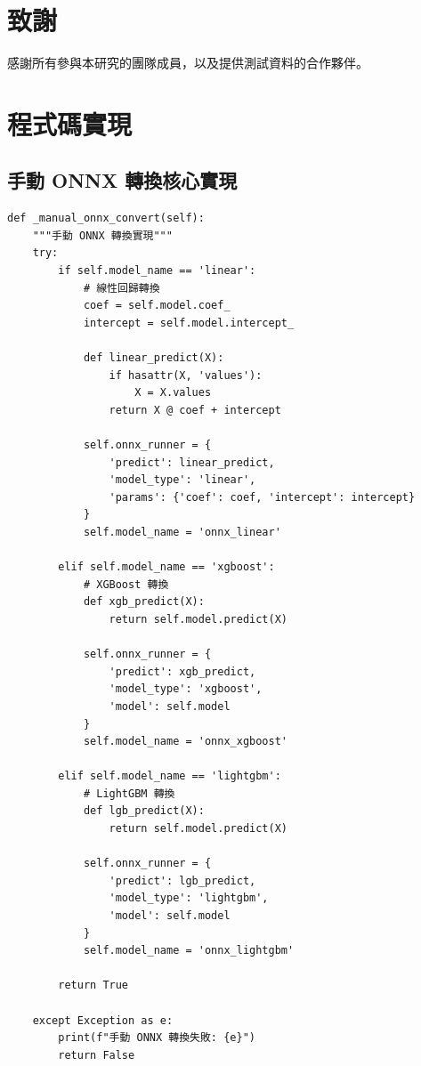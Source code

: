 \documentclass[11pt,a4paper]{article}
\begin{document}
\section*{致謝}

感謝所有參與本研究的團隊成員，以及提供測試資料的合作夥伴。




\appendix

\section{程式碼實現}

\subsection{手動 ONNX 轉換核心實現}

\begin{lstlisting}[caption=手動 ONNX 轉換實現]
def _manual_onnx_convert(self):
    """手動 ONNX 轉換實現"""
    try:
        if self.model_name == 'linear':
            # 線性回歸轉換
            coef = self.model.coef_
            intercept = self.model.intercept_
            
            def linear_predict(X):
                if hasattr(X, 'values'):
                    X = X.values
                return X @ coef + intercept
            
            self.onnx_runner = {
                'predict': linear_predict,
                'model_type': 'linear',
                'params': {'coef': coef, 'intercept': intercept}
            }
            self.model_name = 'onnx_linear'
            
        elif self.model_name == 'xgboost':
            # XGBoost 轉換
            def xgb_predict(X):
                return self.model.predict(X)
            
            self.onnx_runner = {
                'predict': xgb_predict,
                'model_type': 'xgboost',
                'model': self.model
            }
            self.model_name = 'onnx_xgboost'
            
        elif self.model_name == 'lightgbm':
            # LightGBM 轉換
            def lgb_predict(X):
                return self.model.predict(X)
            
            self.onnx_runner = {
                'predict': lgb_predict,
                'model_type': 'lightgbm',
                'model': self.model
            }
            self.model_name = 'onnx_lightgbm'
            
        return True
        
    except Exception as e:
        print(f"手動 ONNX 轉換失敗: {e}")
        return False
\end{lstlisting}
\end{document}
